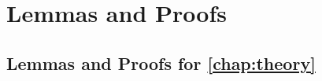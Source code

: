 \chapter{Lemmas and Proofs}

\section{Lemmas and Proofs for \cref{chap:theory}}
\label{section:proofs}